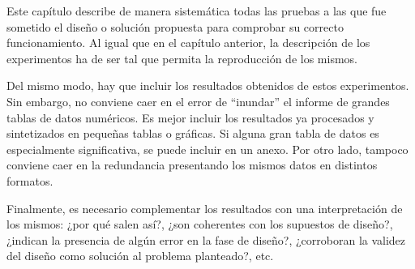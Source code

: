 \noindent Este capítulo describe de manera sistemática todas las pruebas a las que fue sometido el diseño o solución propuesta para comprobar su correcto funcionamiento. Al igual que en el capítulo anterior, la descripción de los experimentos ha de ser tal que permita la reproducción de los mismos.

Del mismo modo, hay que incluir los resultados obtenidos de estos experimentos. Sin embargo, no conviene caer en el error de “inundar” el informe de grandes tablas de datos numéricos. Es mejor incluir los resultados ya procesados y sintetizados en pequeñas tablas o gráficas. Si alguna gran tabla de datos es especialmente significativa, se puede incluir en un anexo. Por otro lado, tampoco conviene caer en la redundancia presentando los mismos datos en distintos formatos.

Finalmente, es necesario complementar los resultados con una interpretación de los mismos: ¿por qué salen así?, ¿son coherentes con los supuestos de diseño?, ¿indican la presencia de algún error en la fase de diseño?, ¿corroboran la validez del diseño como solución al problema planteado?, etc.
